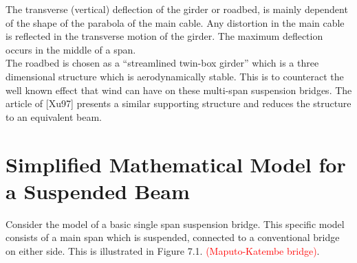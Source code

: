 \documentclass[../../main.tex]{subfiles}
\begin{document}
The transverse (vertical) deflection of the girder or roadbed, is mainly dependent of the shape of the parabola of the main cable. Any distortion in the main cable is reflected in the transverse motion of the girder. The maximum deflection occurs in the middle of a span.
\\

The roadbed is chosen as a ``streamlined twin-box girder'' which is a three dimensional structure which is aerodynamically stable. This is to counteract the well known effect that wind can have on these multi-span suspension bridges. The article of [Xu97] presents a similar supporting structure and reduces the structure to an equivalent beam.\\

\section{Simplified Mathematical Model for a Suspended Beam}
Consider the model of a basic single span suspension bridge. This specific model consists of a main span which is suspended, connected to a conventional bridge on either side. This is illustrated in Figure 7.1. \textcolor{red}{(Maputo-Katembe bridge)}.
\end{document}
